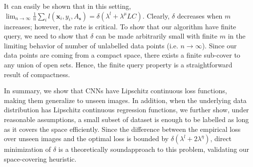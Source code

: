 It can easily be shown that in this setting, $\lim_{n \rightarrow \infty} \frac{1}{n}\sum_i l(\mathbf{x}_i,y_i,A_\mathbf{s}) =    \delta (\lambda^l + \lambda^\mu LC)$. Clearly, $\delta$ decreases when $m$ increases; however, the rate is critical. To show that our algorithm have finite query, we need to show that $\delta$ can be made arbitrarily small with finite $m$ in the limiting behavior of number of unlabelled data points (i.e. $n \rightarrow \infty$). Since our data points are coming from a compact space, there exists a finite sub-cover to any union of open sets. Hence, the finite query property is a straightforward result of compactness. %

\iffalse
\begin{cor}
Given $n$ i.i.d. samples drawn from $p_\mathcal{Z}$ as $\{\mathbf{x}_i,y_i\}_{i\in[n]}$, and a desired error rate $\rho$. If loss function $l(\cdot,y,\mathbf{w})$ is $\lambda^l$-Lipschitz continuous for all $y, \mathbf{w}$, regression function is $\lambda^\eta$-Lipschitz, there exist a finite subset $\mathbf{s}$ with cardinality m such that any CNN achieving $0$ error over $\{\mathbf{x}_{s(j)},y_{s(j)}\}_{j \in [m]}$ achieve the following with probability $1$.
\[
\lim_{n \rightarrow \infty} \frac{1}{n}\sum_i l(\mathbf{x}_i,y_i) \leq \rho %
\]
\label{maincor}
\end{cor}
\fi

In summary, we show that CNNs have Lipschitz continuous loss functions, making them generalize to unseen images. In addition, when the underlying data distribution has Lipschitz continuous regression functions, we further show, under reasonable assumptions, a small subset of dataset is enough to be labelled as long as it covers the space efficiently. Since the difference between the empirical loss over unseen images and the optimal loss is bounded by $\delta(\lambda^l + 2 \lambda^{\eta})$, direct minimization of $\delta$ is a theoretically soundapproach to this problem, validating our space-covering heuristic.
